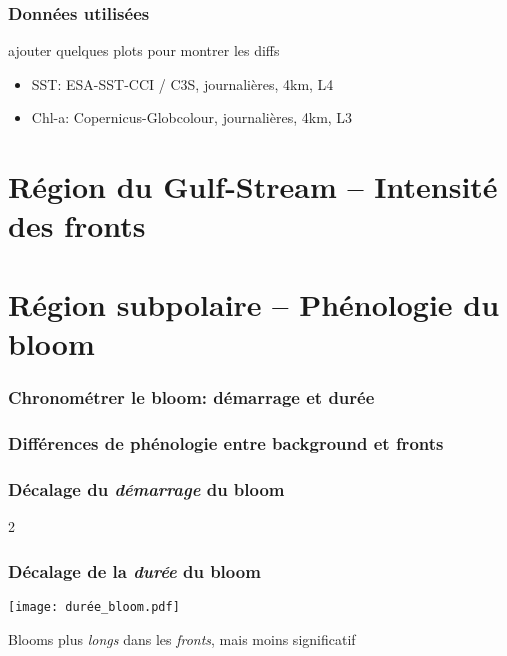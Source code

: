 \begin{frame}
  \frametitle{Données utilisées}

  ajouter quelques plots pour montrer les diffs

  \begin{itemize}
    \item SST: ESA-SST-CCI / C3S, journalières, 4km, L4
    \item Chl-a: Copernicus-Globcolour, journalières, 4km, L3
  \end{itemize}

\end{frame}

\section{Région du Gulf-Stream -- Intensité des fronts}

\section{Région subpolaire -- Phénologie du bloom}


\begin{frame}
  \frametitle{Chronométrer le bloom: démarrage et durée}
\end{frame}

\begin{frame}
  \frametitle{Différences de phénologie entre background et fronts}
\end{frame}

\begin{frame}
  \frametitle{Décalage du \emph{\textit{démarrage}} du bloom}

  \vfill

  \begin{overlayarea}{\textwidth}{2\baselineskip}

  \end{overlayarea}
\end{frame}

\begin{frame}
  \frametitle{Décalage de la \emph{\textit{durée}} du bloom}
  \texttt{[image: durée\_bloom.pdf]}

  \vfill

  Blooms plus \emph{longs} dans les \emph{fronts}, mais moins significatif
\end{frame}

